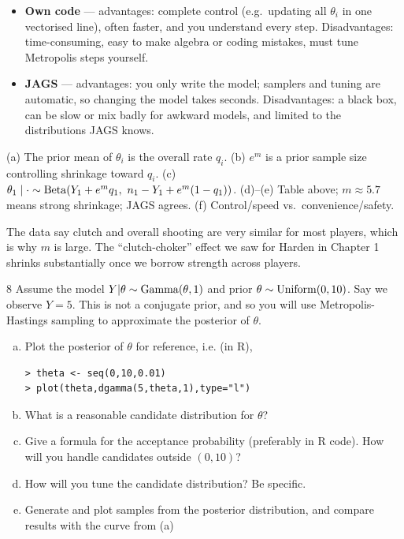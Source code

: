 \documentclass[11pt]{article}
\begin{document}
\begin{itemize}
\item \textbf{Own code} --- advantages: complete control (e.g.\ updating all $\theta_i$ in one vectorised line), often faster, and you understand every step. Disadvantages: time-consuming, easy to make algebra or coding mistakes, must tune Metropolis steps yourself.
\item \textbf{JAGS} --- advantages: you only write the model; samplers and tuning are automatic, so changing the model takes seconds. Disadvantages: a black box, can be slow or mix badly for awkward models, and limited to the distributions JAGS knows.
\end{itemize}

\begin{answer}
(a) The prior mean of $\theta_i$ is the overall rate $q_i$. (b) $e^m$ is a prior sample size controlling shrinkage toward $q_i$. (c) $\theta_1\mid\cdot\sim\dist{Beta}(Y_1+e^mq_1,\ n_1-Y_1+e^m(1-q_1))$. (d)--(e) Table above; $m\approx5.7$ means strong shrinkage; JAGS agrees. (f) Control/speed vs.\ convenience/safety.
\end{answer}

\begin{takeaway}
The data say clutch and overall shooting are very similar for most players, which is why $m$ is large. The ``clutch-choker'' effect we saw for Harden in Chapter 1 shrinks substantially once we borrow strength across players.
\end{takeaway}


\begin{problem}{8}
Assume the model $Y|\theta\sim\mathrm{Gamma}(\theta,1)$ and prior $\theta\sim\mathrm{Uniform}(0,10)$. Say we observe $Y=5$. This is not a conjugate prior, and so you will use Metropolis-Hastings sampling to approximate the posterior of $\theta$.
\begin{enumerate}[(a)]
\item Plot the posterior of $\theta$ for reference, i.e. (in R),
\begin{lstlisting}
> theta <- seq(0,10,0.01)
> plot(theta,dgamma(5,theta,1),type="l")
\end{lstlisting}
\item What is a reasonable candidate distribution for $\theta$?
\item Give a formula for the acceptance probability (preferably in R code). How will you handle candidates outside $(0,10)$?
\item How will you tune the candidate distribution? Be specific.
\item Generate and plot samples from the posterior distribution, and compare results with the curve from (a)
\end{enumerate}
\end{problem}
\end{document}
